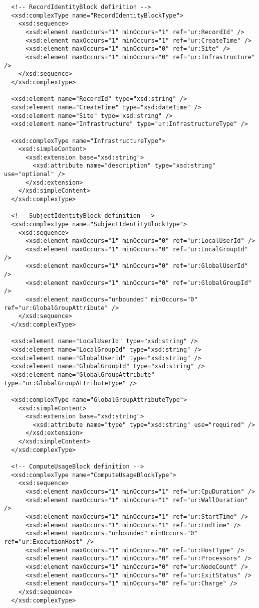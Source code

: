 \begin{verbatim}
  <!-- RecordIdentityBlock definition -->
  <xsd:complexType name="RecordIdentityBlockType">
    <xsd:sequence>
      <xsd:element maxOccurs="1" minOccurs="1" ref="ur:RecordId" />
      <xsd:element maxOccurs="1" minOccurs="1" ref="ur:CreateTime" />
      <xsd:element maxOccurs="1" minOccurs="0" ref="ur:Site" />
      <xsd:element maxOccurs="1" minOccurs="0" ref="ur:Infrastructure" />
    </xsd:sequence>
  </xsd:complexType>

  <xsd:element name="RecordId" type="xsd:string" />
  <xsd:element name="CreateTime" type="xsd:dateTime" />
  <xsd:element name="Site" type="xsd:string" />
  <xsd:element name="Infrastructure" type="ur:InfrastructureType" />
  
  <xsd:complexType name="InfrastructureType">
    <xsd:simpleContent>
      <xsd:extension base="xsd:string">
        <xsd:attribute name="description" type="xsd:string" use="optional" />
      </xsd:extension>
    </xsd:simpleContent>
  </xsd:complexType>

  <!-- SubjectIdentityBlock definition -->
  <xsd:complexType name="SubjectIdentityBlockType">
    <xsd:sequence>
      <xsd:element maxOccurs="1" minOccurs="0" ref="ur:LocalUserId" />
      <xsd:element maxOccurs="1" minOccurs="0" ref="ur:LocalGroupId" />
      <xsd:element maxOccurs="1" minOccurs="0" ref="ur:GlobalUserId" />
      <xsd:element maxOccurs="1" minOccurs="0" ref="ur:GlobalGroupId" />
      <xsd:element maxOccurs="unbounded" minOccurs="0" ref="ur:GlobalGroupAttribute" />
    </xsd:sequence>
  </xsd:complexType>

  <xsd:element name="LocalUserId" type="xsd:string" />
  <xsd:element name="LocalGroupId" type="xsd:string" />
  <xsd:element name="GlobalUserId" type="xsd:string" />
  <xsd:element name="GlobalGroupId" type="xsd:string" />
  <xsd:element name="GlobalGroupAttribute" type="ur:GlobalGroupAttributeType" />
  
  <xsd:complexType name="GlobalGroupAttributeType">
    <xsd:simpleContent>
      <xsd:extension base="xsd:string">
        <xsd:attribute name="type" type="xsd:string" use="required" />
      </xsd:extension>
    </xsd:simpleContent>
  </xsd:complexType>

  <!-- ComputeUsageBlock definition -->
  <xsd:complexType name="ComputeUsageBlockType">
    <xsd:sequence>
      <xsd:element maxOccurs="1" minOccurs="1" ref="ur:CpuDuration" />
      <xsd:element maxOccurs="1" minOccurs="1" ref="ur:WallDuration" />
      <xsd:element maxOccurs="1" minOccurs="1" ref="ur:StartTime" />
      <xsd:element maxOccurs="1" minOccurs="1" ref="ur:EndTime" />
      <xsd:element maxOccurs="unbounded" minOccurs="0" ref="ur:ExecutionHost" />
      <xsd:element maxOccurs="1" minOccurs="0" ref="ur:HostType" />
      <xsd:element maxOccurs="1" minOccurs="0" ref="ur:Processors" />
      <xsd:element maxOccurs="1" minOccurs="0" ref="ur:NodeCount" />
      <xsd:element maxOccurs="1" minOccurs="0" ref="ur:ExitStatus" />
      <xsd:element maxOccurs="1" minOccurs="0" ref="ur:Charge" />
    </xsd:sequence>
  </xsd:complexType>


\end{verbatim}
